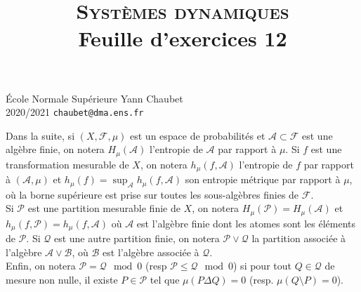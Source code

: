 \documentclass[a4paper,10pt,openany]{article}
\title{\textsc{Syst\`emes dynamiques} \\ Feuille d'exercices 12}
\date{}
\author{}
\theoremstyle{plain}
\theoremstyle{definition}
\begin{document}
{\noindent \'Ecole Normale Sup\'erieure  \hfill Yann Chaubet } \\
{2020/2021 \hfill \texttt{chaubet@dma.ens.fr}}

{\let\newpage\relax\maketitle}
\maketitle

Dans la suite, si $(X, \mathcal{F}, \mu)$ est un espace de probabilit\'es et $\mathcal{A} \subset \mathcal{F}$ est une alg\`ebre finie, on notera $H_\mu(\mathcal{A})$ l'entropie de $\mathcal{A}$ par rapport \`a $\mu$. Si $f$ est une transformation mesurable de $X$, on notera $h_\mu(f, \mathcal{A})$ l'entropie de $f$ par rapport \`a $(\mathcal{A},\mu)$ et $h_\mu(f) = \sup_{\mathcal{A}} h_\mu(f,\mathcal{A})$ son entropie m\'etrique par rapport \`a $\mu$, o\`u la borne sup\'erieure est prise sur toutes les sous-alg\`ebres finies de $\mathcal{F}$. \\

Si $\mathcal{P}$ est une partition mesurable finie de $X$, on notera $H_\mu(\mathcal{P}) = H_\mu(\mathcal{A})$ et $h_\mu(f, \mathcal{P}) = h_\mu(f, \mathcal{A})$ o\`u $\mathcal{A}$ est l'alg\`ebre finie dont les atomes sont les \'el\'ements de $\mathcal{P}$. Si $\mathcal{Q}$ est une autre partition finie, on notera $\mathcal{P} \vee \mathcal{Q}$ la partition associ\'ee \`a l'alg\`ebre $\mathcal{A} \vee \mathcal{B}$, o\`u $\mathcal{B}$ est l'alg\`ebre associ\'ee \`a $\mathcal{Q}$. \\

Enfin, on notera $\mathcal{P} = \mathcal{Q} \mod 0$ (resp $\mathcal{P} \leq \mathcal{Q} \mod 0$) si pour tout $Q \in \mathcal{Q}$ de mesure non nulle, il existe $P \in \mathcal{P}$ tel que $\mu(P \Delta Q) = 0$ (resp. $\mu(Q \setminus P) = 0$).
 \\ \\

 \vspace{1.5mm} 
\end{document}

